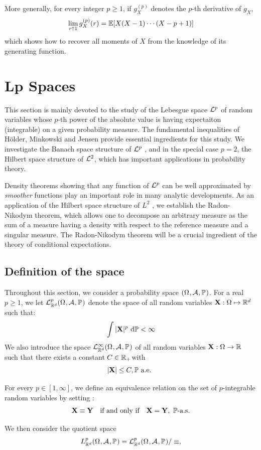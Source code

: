 \documentclass[../Main.tex]{subfiles}
\begin{document}
More generally, for every integer $p \geq 1$, if $g_X^{(p)}$ denotes the $p$-th derivative of $g_X$,
\[\lim_{r \uparrow 1} g_X^{(p)}(r) = \mathbb{E}[X(X-1)\cdots(X-p+1)]\]
which shows how to recover all moments of $X$ from the knowledge of its generating function.

\section{Lp Spaces} \label{sec:Lp spaces}
This section is mainly devoted to the study of the Lebesgue space $\mathcal{L}^p$ of random variables whose $p$-th power of the absolute value is having expectaiton (integrable) on a given probability measure. The fundamental inequalities of Hölder, Minkowski and Jensen provide essential ingredients for this study. We investigate the Banach space structure of $\mathcal{L}^p$ , and in the special case $p = 2$, the Hilbert space structure of $\mathcal{L}^2$, which has important applications in probability theory. 

Density theorems showing that any function of $\mathcal{L}^p$ can be well approximated by \textit{smoother} functions play an important role in many analytic developments. As an application of the Hilbert space structure of $L^2$ , we establish the Radon-Nikodym theorem, which allows one to decompose an arbitrary measure as the sum of a measure having a density with respect to the reference measure and a singular measure. The Radon-Nikodym theorem will be a crucial ingredient of the theory of conditional expectations.


\subsection{Deﬁnition of the space}
Throughout this section, we consider a probability space $(\Omega_{}, \mathcal{A}_{}, \mathbb{P}_{})$. For a real $p \geq 1$, we let $\mathcal{L}^p_{\mathbb{R}^d}(\Omega_{}, \mathcal{A}_{}, \mathbb{P}_{})$ denote the space of all random variables $\mathbf{X}: \Omega  \mapsto \mathbb{R}^d$ such that:
\[ \int|\mathbf{X}|^p \mathrm{~d} \mathbb{P}<\infty  \]
We also introduce the space $\mathcal{L}^{\infty}_{\mathbb{R}^d}(\Omega_{}, \mathcal{A}_{}, \mathbb{P}_{})$ of all random variables $\mathbf{X}: \Omega \rightarrow \mathbb{R}$ such that there exists a constant $C \in \mathbb{R}_{+}$with
\[ |\mathbf{X}| \leq C, \mathbb{P} \text { a.e. } \]

For every $p\in[1,\infty]$, we define an equivalence relation on the set of
$p$-integrable random variables by setting : 
\[ \bX \equiv \bY \quad \text{if and only if} \quad \bX=\bY,\ \PP\text{-a.s.} \]

We then consider the quotient space
\[ L^p_{\mathbb{R}^d}(\Omega_{}, \mathcal{A}_{}, \mathbb{P}_{})= \mathcal{L}^p_{\mathbb{R}^d}(\Omega_{}, \mathcal{A}_{}, \mathbb{P}_{})/\equiv, \]
\end{document}
